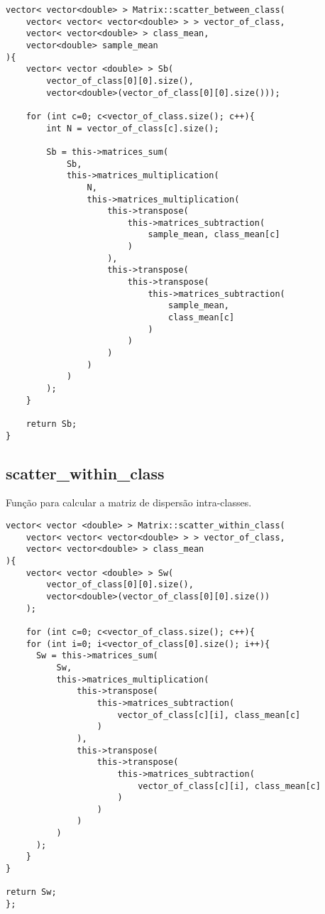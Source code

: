 \documentclass[a4paper, 11pt]{article}
\begin{document}
\begin{lstlisting}
vector< vector<double> > Matrix::scatter_between_class(
	vector< vector< vector<double> > > vector_of_class, 
    vector< vector<double> > class_mean, 
    vector<double> sample_mean
){
    vector< vector <double> > Sb(
        vector_of_class[0][0].size(), 
        vector<double>(vector_of_class[0][0].size()));
		
    for (int c=0; c<vector_of_class.size(); c++){
    	int N = vector_of_class[c].size();

        Sb = this->matrices_sum(
        	Sb,
        	this->matrices_multiplication(
        		N, 
        		this->matrices_multiplication(
        			this->transpose(
                    	this->matrices_subtraction(
                        	sample_mean, class_mean[c]
                        )
                    ), 
        			this->transpose(
                    	this->transpose(
                        	this->matrices_subtraction(
                            	sample_mean, 
                                class_mean[c]
                            )
                        )
                    )
        		)
        	)
        );
    }

    return Sb;
}
\end{lstlisting}


\subsection*{scatter\_within\_class}
Função para calcular a matriz de dispersão intra-classes.

\begin{lstlisting}
vector< vector <double> > Matrix::scatter_within_class(
	vector< vector< vector<double> > > vector_of_class, 
    vector< vector<double> > class_mean
){
	vector< vector <double> > Sw(
    	vector_of_class[0][0].size(), 
        vector<double>(vector_of_class[0][0].size())
    );
		
	for (int c=0; c<vector_of_class.size(); c++){
	for (int i=0; i<vector_of_class[0].size(); i++){
      Sw = this->matrices_sum(
          Sw,
          this->matrices_multiplication(
              this->transpose(
              	  this->matrices_subtraction(
                	  vector_of_class[c][i], class_mean[c]
              	  )
              ), 
              this->transpose(
              	  this->transpose(
                  	  this->matrices_subtraction(
                      	  vector_of_class[c][i], class_mean[c]
                      )
                  )
              )
          )
      );
	}	
}

return Sw;
};
\end{lstlisting}
\end{document}
